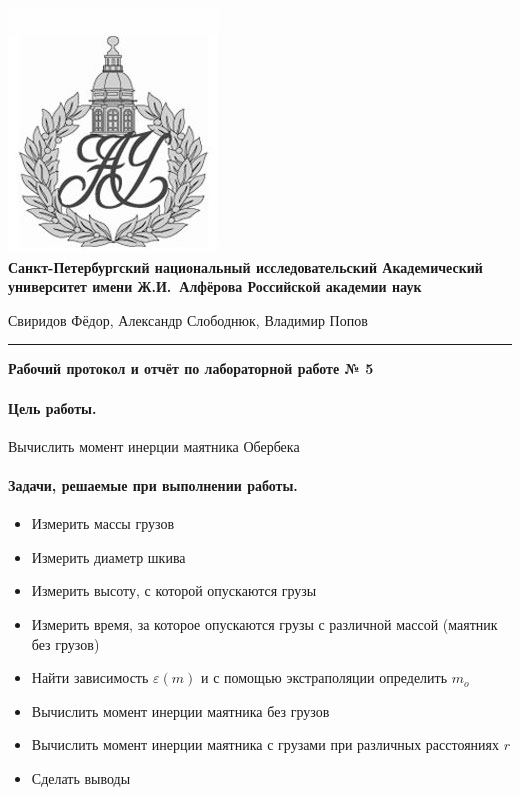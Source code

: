 \documentclass{article}
\begin{document}
\begin{center}
	\includegraphics[scale=0.25]{AU}\\
	{\Large\bfseries Санкт-Петербургский национальный исследовательский Академический университет имени Ж.И.~Алфёрова Российской академии наук}
\end{center}

\begin{center}
	Свиридов Фёдор, Александр Слободнюк, Владимир Попов
\end{center}
\rule{12cm}{0.4mm}
\begin{center}
	{\large\textbf{Рабочий протокол и отчёт по лабораторной работе № 5}}
\end{center}
\paragraph{Цель работы.}
Вычислить момент инерции маятника Обербека

\paragraph{Задачи, решаемые при выполнении работы.}
\begin{itemize}
	\item Измерить массы грузов
	\item Измерить диаметр шкива
	\item Измерить высоту, с которой опускаются грузы
	\item Измерить время, за которое опускаются грузы с различной массой (маятник без грузов)
	\item Найти зависимость $\varepsilon(m)$ и с помощью экстраполяции определить $m_o$
	\item Вычислить момент инерции маятника без грузов
	\item Вычислить момент инерции маятника с грузами при различных расстояниях $r$
	\item Сделать выводы
\end{itemize}
\end{document}
